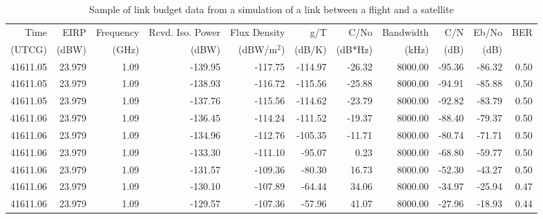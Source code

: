 \begin{table}[htbp]
  \centering
  \tiny
  \caption{Sample of link budget data from a simulation of a link between a flight and a satellite}
    \begin{tabular}{rrrrrrrrrrr}
    \toprule
    Time & EIRP & Frequency  & Rcvd. Iso. Power & Flux Density  & g/T &  C/No  & Bandwidth  & C/N & Eb/No  & BER \\
    (UTCG)  & (dBW) & (GHz) & (dBW) & (dBW/m$^2$) & (dB/K) & (dB*Hz) & (kHz) & (dB) & (dB) \\
    \midrule
    41611.05 & 23.979 & 1.09  & -139.95 & -117.75 & -114.97 & -26.32 & 8000.00 & -95.36 & -86.32 & 0.50 \\
    41611.05 & 23.979 & 1.09  & -138.93 & -116.72 & -115.56 & -25.88 & 8000.00 & -94.91 & -85.88 & 0.50 \\
    41611.05 & 23.979 & 1.09  & -137.76 & -115.56 & -114.62 & -23.79 & 8000.00 & -92.82 & -83.79 & 0.50 \\
    41611.06 & 23.979 & 1.09  & -136.45 & -114.24 & -111.52 & -19.37 & 8000.00 & -88.40 & -79.37 & 0.50 \\
    41611.06 & 23.979 & 1.09  & -134.96 & -112.76 & -105.35 & -11.71 & 8000.00 & -80.74 & -71.71 & 0.50 \\
    41611.06 & 23.979 & 1.09  & -133.30 & -111.10 & -95.07 & 0.23  & 8000.00 & -68.80 & -59.77 & 0.50 \\
    41611.06 & 23.979 & 1.09  & -131.57 & -109.36 & -80.30 & 16.73 & 8000.00 & -52.30 & -43.27 & 0.50 \\
    41611.06 & 23.979 & 1.09  & -130.10 & -107.89 & -64.44 & 34.06 & 8000.00 & -34.97 & -25.94 & 0.47 \\
    41611.06 & 23.979 & 1.09  & -129.57 & -107.36 & -57.96 & 41.07 & 8000.00 & -27.96 & -18.93 & 0.44 \\
    \bottomrule
    \end{tabular}%
  \label{tab:results_linkbudget_sample1}%
\end{table}%
